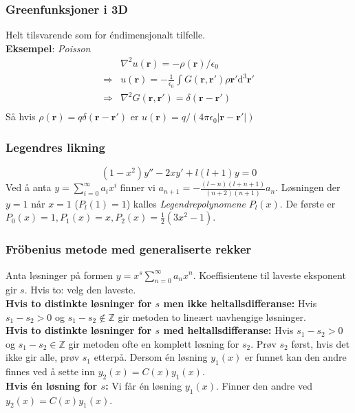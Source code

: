 \documentclass[a4paper, norsk, 8pt]{article}
\newcommand{\EQU}[1] { \begin{equation*} \begin{split}
#1  
\end{split} \end{equation*} }
\begin{document}
\begin{multicols*}{2}
\subsubsection*{\small Greenfunksjoner i 3D}
Helt tilsvarende som for éndimensjonalt tilfelle. \\
\textbf{Eksempel}: \textit{Poisson}\\
\EQU{
& \nabla^2 u(\mathbf{r})=-\rho(\mathbf{r})/\epsilon_0 \\
\Rightarrow & u(\mathbf{r})=-\frac{1}{\epsilon_0}\int G(\mathbf{r},\mathbf{r}')\rho{\mathbf{r}'}\mbox{d}^3\mathbf{r}' \\
\Rightarrow & \nabla^2 G(\mathbf{r},\mathbf{r}')=\delta(\mathbf{r}-\mathbf{r}') \\
}
Så hvis $\rho(\mathbf{r})=q\delta(\mathbf{r}-\mathbf{r}')$ er $u(\mathbf{r})=q/(4\pi\epsilon_0|\mathbf{r}-\mathbf{r}'|)$



\subsubsection*{\small Legendres likning}
\[ (1-x^2)y''-2xy'+l(l+1)y=0 \]
Ved å anta $y=\sum_{i=0}^\infty a_ix^i$ finner vi $a_{n+1}=-\frac{(l-n)(l+n+1)}{(n+2)(n+1)}a_n$. Løsningen der $y=1$ når $x=1$ ($P_l(1)=1$) kalles \textit{Legendrepolynomene} $P_l(x)$. De første er $P_0(x)=1,P_1(x)=x,P_2(x)=\frac{1}{2}(3x^2-1)$.

\subsubsection*{\small Fröbenius metode med generaliserte rekker}
Anta løsninger på formen $y=x^s\sum_{n=0}^\infty a_nx^n$. Koeffisientene til laveste eksponent gir $s$. Hvis to: velg den laveste. \\
\textbf{Hvis to distinkte løsninger for $s$ men ikke heltallsdifferanse:} Hvis $s_1-s_2>0$ og $s_1-s_2 \notin \mathbb{Z}$ gir metoden to lineært uavhengige løsninger. \\
\textbf{Hvis to distinkte løsninger for $s$ med heltallsdifferanse:} Hvis $s_1-s_2>0$ og $s_1-s_2 \in \mathbb{Z}$ gir metoden ofte en komplett løsning for $s_2$. Prøv $s_2$ først, hvis det ikke gir alle, prøv $s_1$ etterpå. Dersom én løsning $y_1(x)$ er funnet kan den andre finnes ved å sette inn $y_2(x)=C(x)y_1(x)$. \\
\textbf{Hvis én løsning for $s$:} Vi får én løsning $y_1(x)$. Finner den andre ved $y_2(x)=C(x)y_1(x)$.


\end{multicols*}
\end{document}
